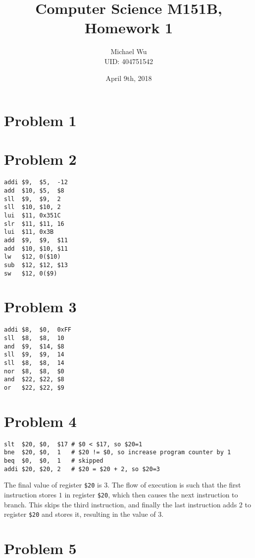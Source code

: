 \documentclass[12pt]{article}
\begin{document}
\title{Computer Science M151B, Homework 1}
\date{April 9th, 2018}
\author{Michael Wu\\UID: 404751542}
\maketitle

\section*{Problem 1}
\section*{Problem 2}

\begin{verbatim}
addi $9,  $5,  -12
add  $10, $5,  $8
sll  $9,  $9,  2
sll  $10, $10, 2
lui  $11, 0x351C
slr  $11, $11, 16
lui  $11, 0x3B
add  $9,  $9,  $11
add  $10, $10, $11
lw   $12, 0($10)
sub  $12, $12, $13
sw   $12, 0($9)
\end{verbatim}

\section*{Problem 3}

\begin{verbatim}
addi $8,  $0,  0xFF
sll  $8,  $8,  10
and  $9,  $14, $8
sll  $9,  $9,  14
sll  $8,  $8,  14
nor  $8,  $8,  $0
and  $22, $22, $8
or   $22, $22, $9
\end{verbatim}

\section*{Problem 4}

\begin{verbatim}
slt  $20, $0,  $17 # $0 < $17, so $20=1
bne  $20, $0,  1   # $20 != $0, so increase program counter by 1
beq  $0,  $0,  1   # skipped
addi $20, $20, 2   # $20 = $20 + 2, so $20=3
\end{verbatim}
The final value of register \texttt{\$20} is \(3\). The flow of execution is such that the first instruction stores \(1\) in register
\texttt{\$20}, which then causes the next instruction to branch. This skips the third instruction, and finally the last instruction adds
\(2\) to register \texttt{\$20} and stores it, resulting in the value of \(3\).

\section*{Problem 5}
\end{document}
